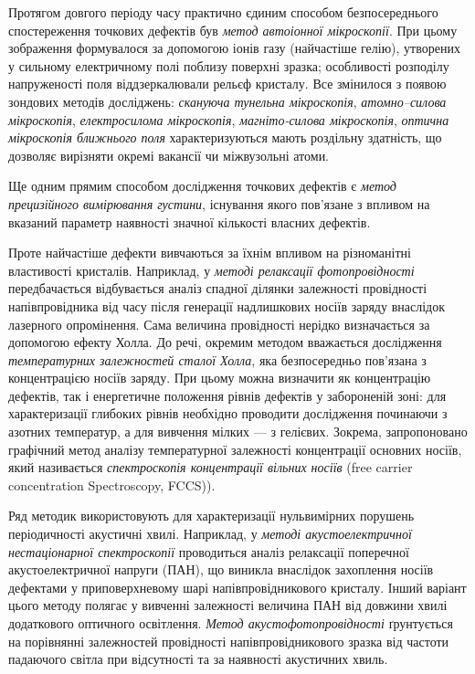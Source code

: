 Протягом довгого періоду часу практично єдиним способом безпосереднього 
спостереження точкових дефектів був \emph{метод автоіонної мікроскопії}.
При цьому зображення формувалося за допомогою іонів газу (найчастіше гелію),
утворених у сильному електричному полі поблизу поверхні зразка;
особливості розподілу напруженості поля віддзеркалювали рельєф кристалу.
Все змінилося з появою зондових методів досліджень:
\emph{скануюча тунельна мікроскопія}, \emph{атомно--силова мікроскопія},
\emph{електросилома мікроскопія}, \emph{магніто-силова мікроскопія},
\emph{оптична мікроскопія ближнього поля} характеризуються 
мають роздільну здатність, що дозволяє вирізняти окремі вакансії чи міжвузольні атоми.

Ще одним прямим способом дослідження точкових дефектів є 
\emph{метод прецизійного вимірювання густини}, існування якого пов'язане
з впливом на вказаний параметр наявності значної кількості власних дефектів.

Проте найчастіше дефекти вивчаються за їхнім впливом на різноманітні властивості кристалів.
Наприклад, у \emph{методі релаксації фотопровідності} передбачається відбувається
аналіз спадної ділянки залежності провідності напівпровідника від часу після
генерації надлишкових носіїв заряду внаслідок лазерного опромінення.
Сама величина провідності нерідко визначається за допомогою ефекту Холла.
До речі, окремим методом вважається
дослідження \emph{температурних залежностей сталої Холла}, яка безпосередньо пов'язана з
концентрацією носіїв заряду.
При цьому можна визначити як концентрацію дефектів, так і 
енергетичне положення рівнів дефектів у забороненій зоні: для характеризації глибоких рівнів
необхідно проводити дослідження починаючи з азотних температур, 
а для вивчення мілких --- з гелієвих.
Зокрема, запропоновано графічний метод аналізу температурної залежності концентрації основних носіїв,
який називається \emph{спектроскопія концентрації вільних носіїв} (free carrier 
concentration Spectroscopy, FCCS)).


Ряд методик використовують для характеризації нульвимірних порушень періодичності акустичні хвилі.
Наприклад, у \emph{методі акустоелектричної нестаціонарної спектроскопії} проводиться аналіз
релаксації поперечної акустоелектричної напруги (ПАН), що виникла внаслідок захоплення носіїв
дефектами у приповерхневому шарі напівпровідникового кристалу.  
Інший варіант цього методу полягає у вивченні залежності величина ПАН від довжини хвилі додаткового оптичного освітлення.
\emph{Метод акустофотопровідності} ґрунтується на порівнянні залежностей провідності 
напівпровідникового зразка від частоти падаючого світла при відсутності та за наявності 
акустичних хвиль.

